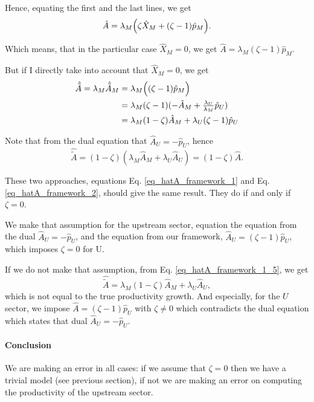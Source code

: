 \documentclass[11pt]{article}
\begin{document}
Hence, equating the first and the last lines, we get
\begin{equation}
\label{eq_hatA_framework_1}
 \hat{A}=    \lambda_M\Bigl(\zeta \hat{X}_M + (\zeta-1) \hat{p}_M\Bigr).
\end{equation}

Which means, that in the particular case $\hat{X}_M=0$, we get $ \hat{A}=    \lambda_M(\zeta-1) \hat{p}_M.
$

But if I directly take into account that $\hat{X}_M=0$, we get
\begin{equation}
\label{eq_hatA_framework_1_5}
    \begin{aligned}
    \hat{\tilde{A}}=\lambda_M  \hat{\tilde{A}}_M 
    &= \lambda_M\Bigl((\zeta-1) \hat{p}_M\Bigr)\\
    &= \lambda_M(\zeta-1) (-\hat{A}_M+\tfrac{\lambda_U}{\lambda_M} \hat{p}_U)\\
    &= \lambda_M(1-\zeta) \hat{A}_M +\lambda_U(\zeta-1)\hat{p}_U
\end{aligned}
\end{equation}

Note that from the dual equation that $\hat{A}_U=-\hat{p}_U$, hence
\begin{equation} 
\label{eq_hatA_framework_2}
     \hat{\tilde{A}}= (1-\zeta)\left(\lambda_M \hat{A}_M +\lambda_U\hat{A}_U\right)=
     (1-\zeta)\hat{A}.
\end{equation}

These two approaches, equations Eq. \eqref{eq_hatA_framework_1} and Eq. \eqref{eq_hatA_framework_2}, should give the same result. They do if and only if $\zeta=0$. 

We make that assumption for the upstream sector, equation the equation from the dual  $\hat{A}_U=-\hat{p}_U$, and the equation from our framework,  $\hat{A}_U=(\zeta-1)\hat{p}_U$, which imposes $\zeta=0$ for U. 

If we do not make that assumption, from Eq. \eqref{eq_hatA_framework_1_5}, we get
\begin{equation*}
    \hat{\tilde{A}}=\lambda_M(1-\zeta) \hat{A}_M +\lambda_U\hat{A}_U,
\end{equation*}
which is not equal to the true productivity growth.
And especially, for the $U$ sector, we impose $\hat{A}=(\zeta-1)\hat{p}_U$ with $\zeta\neq0$ which contradicts the dual equation which states that dual  $\hat{A}_U=-\hat{p}_U$.

\paragraph{Conclusion} We are making an error in all cases: if we assume that $\zeta=0$ then we have a trivial model (see previous section), if not we are making an error on computing the productivity of the upstream sector. 
\end{document}
